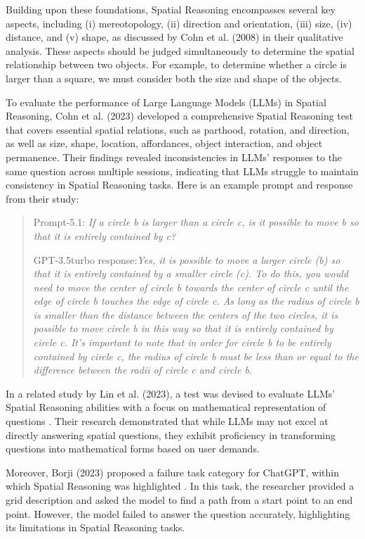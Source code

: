 \documentclass[twocolumn,11pt]{report}
\begin{document}
Building upon these foundations, Spatial Reasoning encompasses several key aspects, including (i) mereotopology, (ii) direction and orientation, (iii) size, (iv) distance, and (v) shape, as discussed by Cohn et al. (2008) in their qualitative analysis\cite{cohn2008qualitative}. These aspects should be judged simultaneously to determine the spatial relationship between two objects. For example, to determine whether a circle is larger than a square, we must consider both the size and shape of the objects. 

To evaluate the performance of Large Language Models (LLMs) in Spatial Reasoning, Cohn et al. (2023) developed a comprehensive Spatial Reasoning test that covers essential spatial relations, such as parthood, rotation, and direction, as well as size, shape, location, affordances, object interaction, and object permanence\cite{cohn2023dialectical}. Their findings revealed inconsistencies in LLMs' responses to the same question across multiple sessions, indicating that LLMs struggle to maintain consistency in Spatial Reasoning tasks. Here is an example prompt and response from their study:
\begin{quotation}
    Prompt-5.1: \emph{If a circle b is larger than a circle c, is it possible to move b so that it is entirely contained by c?}

    GPT-3.5turbo response:\emph{Yes, it is possible to move a larger circle (b) so that it is entirely contained by a smaller circle (c). To do this, you would need to move the 
    center of circle b towards the center of circle c until the edge of circle b touches the edge of circle c. As long as the radius of circle b is smaller than the distance between the centers of the two circles, it is possible to move circle b in this way so that it is entirely contained by circle c. It’s important to note that in order for circle b to be entirely contained by circle c, the radius of circle b must be less than or equal to the 
    difference between the radii of circle c and circle b.}
\end{quotation}

In a related study by Lin et al. (2023), a test was devised to evaluate LLMs' Spatial Reasoning abilities with a focus on mathematical representation of questions \cite{lin2023using}. Their research demonstrated that while LLMs may not excel at directly answering spatial questions, they exhibit proficiency in transforming questions into mathematical forms based on user demands.

Moreover, Borji (2023) proposed a failure task category for ChatGPT, within which Spatial Reasoning was highlighted \cite{borji2023categorical}. In this task, the researcher provided a grid description and asked the model to find a path from a start point to an end point. However, the model failed to answer the question accurately, highlighting its limitations in Spatial Reasoning tasks.
\end{document}
